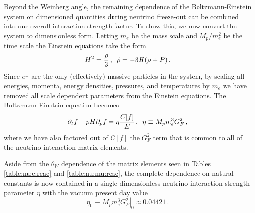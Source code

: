 Beyond the Weinberg angle, the remaining dependence of the Boltzmann-Einstein system on dimensioned quantities during neutrino freeze-out can be combined into one overall interaction strength factor. To show this, we now convert the system to dimensionless form. Letting $m_e$ be the mass scale and $M_p/m_e^2$ be the time scale the Einstein equations take the form
\begin{equation}
H^2=\frac{\rho}{3}\,,\hspace{2mm}\dot\rho=-3H(\rho+P)\,.
\end{equation}
 Since $e^\pm$ are the only (effectively) massive particles in the system, by scaling all energies, momenta, energy densities, pressures, and temperatures by $m_e$ we have removed all scale dependent parameters from the Einstein equations. The Boltzmann-Einstein equation becomes
\begin{equation}\label{eta_def}
\partial_tf-pH\partial_pf=\eta\frac{C[f]}{E}\,,\hspace{2mm}\eta\equiv M_p m_e^3G_F^2\,,
\end{equation}
where we have also factored out of $C[f]$ the $G_F^2$ term that is common to all of the neutrino interaction matrix elements. 

Aside from the $\theta_W$ dependence of the matrix elements seen in Tables \ref{table:nu:e:reac} and \ref{table:nu:mu:reac}, the complete dependence on natural constants is now contained in a single dimensionless neutrino interaction strength parameter $\eta$ with the vacuum present day value
\begin{equation}\label{eta0_def}
\eta_0\equiv \left.M_p m_e^3 G_F^2\right|_0 \approx 0.04421\, .
\end{equation}

